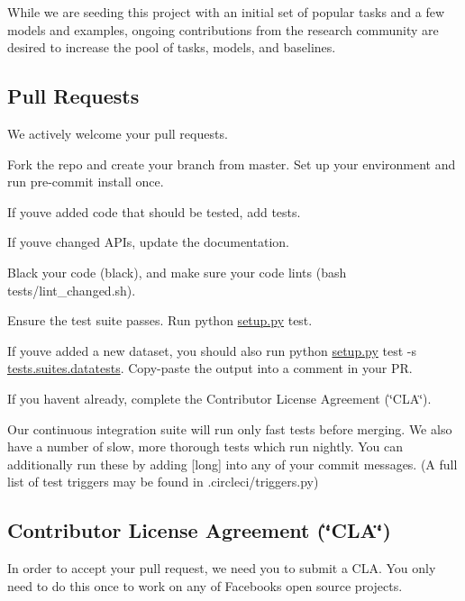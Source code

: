 While we are seeding this project with an initial set of popular tasks and a few models and examples, ongoing contributions from the research community are desired to increase the pool of tasks, models, and baselines.

\subsection*{Pull Requests}

We actively welcome your pull requests.


\begin{DoxyEnumerate}
\item Fork the repo and create your branch from {\ttfamily master}. Set up your environment and run {\ttfamily pre-\/commit install} once.
\item If you\textquotesingle{}ve added code that should be tested, add tests.
\item If you\textquotesingle{}ve changed A\+P\+Is, update the documentation.
\item Black your code ({\ttfamily black}), and make sure your code lints ({\ttfamily bash tests/lint\+\_\+changed.\+sh}).
\item Ensure the test suite passes. Run {\ttfamily python \hyperlink{setup_8py}{setup.\+py} test}.
\item If you\textquotesingle{}ve added a new dataset, you should also run {\ttfamily python \hyperlink{setup_8py}{setup.\+py} test -\/s \hyperlink{namespacetests_1_1suites_a1e7ee73a4d3645058850bc743ad6b668}{tests.\+suites.\+datatests}}. Copy-\/paste the output into a comment in your PR.
\item If you haven\textquotesingle{}t already, complete the Contributor License Agreement (\char`\"{}\+C\+L\+A\char`\"{}).
\end{DoxyEnumerate}

Our continuous integration suite will run only fast tests before merging. We also have a number of slow, more thorough tests which run nightly. You can additionally run these by adding {\ttfamily \mbox{[}long\mbox{]}} into any of your commit messages. (A full list of test triggers may be found in {\ttfamily .circleci/triggers.\+py})

\subsection*{Contributor License Agreement (\char`\"{}\+C\+L\+A\char`\"{})}

In order to accept your pull request, we need you to submit a C\+LA. You only need to do this once to work on any of Facebook\textquotesingle{}s open source projects.

